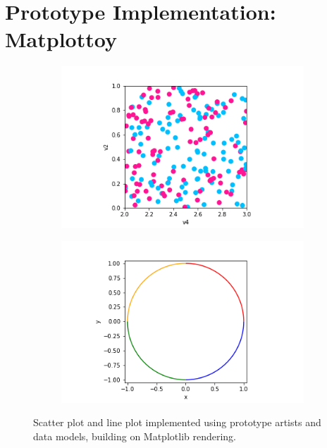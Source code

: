 \documentclass[../main.tex]{subfiles}
\begin{document}
\section{Prototype Implementation: Matplottoy}
\label{sec:implementation}
\begin{figure}[H]
    \begin{subfigure}{0.5\textwidth}
        \includegraphics[width=\textwidth]{figures/code/scatter_0.png}
    \end{subfigure}
    \begin{subfigure}{0.5\textwidth}
        \includegraphics[width=\textwidth]{figures/code/line_1.png}
    \end{subfigure}
    \caption{Scatter plot and line plot implemented using prototype artists and data models, building on Matplotlib rendering.}
    \label{fig:code_scatter_line}
\end{figure}
\end{document}
